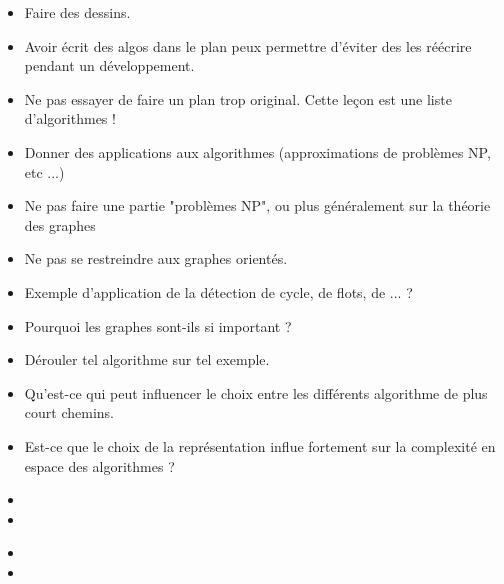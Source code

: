 \documentclass{agregfiche}
\begin{document}
\secpieges

\begin{itemize}
    \item Faire des dessins.
    \item Avoir écrit des algos dans le plan peux permettre d'éviter des les réécrire pendant un développement.
    \item Ne pas essayer de faire un plan trop original. Cette leçon est une liste d'algorithmes !
    \item Donner des applications aux algorithmes (approximations de problèmes NP, etc ...)
    \item Ne pas faire une partie "problèmes NP", ou plus généralement sur la théorie des graphes
    \item Ne pas se restreindre aux graphes orientés.
\end{itemize}

\secquestionsclassiques

\begin{itemize}
    \item Exemple d'application de la détection de cycle, de flots, de ... ?
    \item Pourquoi les graphes sont-ils si important ?
    \item Dérouler tel algorithme sur tel exemple.
    \item Qu'est-ce qui peut influencer le choix entre les différents algorithme de plus court chemins.
    \item Est-ce que le choix de la représentation influe fortement sur la complexité en espace des algorithmes ?
\end{itemize}

\secreferences

\begin{itemize}
    \item 
    \item 
\end{itemize}

\secdev

\begin{itemize}
	\item 
	\item 
\end{itemize}
\end{document}

